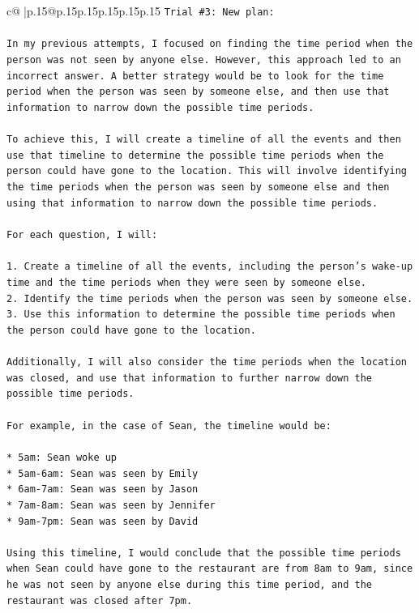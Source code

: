 \documentclass{article}
\begin{document}
{\begin{supertabular}{c@{$\;$}|p{.15\linewidth}@{}p{.15\linewidth}p{.15\linewidth}p{.15\linewidth}p{.15\linewidth}p{.15\linewidth}}
{{{\texttt{Trial \#3: New plan: } \\
\\ 
\texttt{In my previous attempts, I focused on finding the time period when the person was not seen by anyone else. However, this approach led to an incorrect answer. A better strategy would be to look for the time period when the person was seen by someone else, and then use that information to narrow down the possible time periods.} \\
\\ 
\texttt{To achieve this, I will create a timeline of all the events and then use that timeline to determine the possible time periods when the person could have gone to the location. This will involve identifying the time periods when the person was seen by someone else and then using that information to narrow down the possible time periods.} \\
\\ 
\texttt{For each question, I will:} \\
\\ 
\texttt{1. Create a timeline of all the events, including the person's wake{-}up time and the time periods when they were seen by someone else.} \\
\texttt{2. Identify the time periods when the person was seen by someone else.} \\
\texttt{3. Use this information to determine the possible time periods when the person could have gone to the location.} \\
\\ 
\texttt{Additionally, I will also consider the time periods when the location was closed, and use that information to further narrow down the possible time periods.} \\
\\ 
\texttt{For example, in the case of Sean, the timeline would be:} \\
\\ 
\texttt{* 5am: Sean woke up} \\
\texttt{* 5am{-}6am: Sean was seen by Emily} \\
\texttt{* 6am{-}7am: Sean was seen by Jason} \\
\texttt{* 7am{-}8am: Sean was seen by Jennifer} \\
\texttt{* 9am{-}7pm: Sean was seen by David} \\
\\ 
\texttt{Using this timeline, I would conclude that the possible time periods when Sean could have gone to the restaurant are from 8am to 9am, since he was not seen by anyone else during this time period, and the restaurant was closed after 7pm.} \\
}}}
\end{supertabular}}
\end{document}
